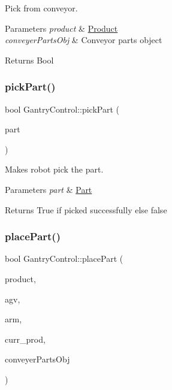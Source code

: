 Pick from conveyor. 


\begin{DoxyParams}{Parameters}
{\em product} & \hyperlink{structProduct}{Product} \\
\hline
{\em conveyer\+Parts\+Obj} & Conveyor parts object \\
\hline
\end{DoxyParams}
\begin{DoxyReturn}{Returns}
Bool 
\end{DoxyReturn}
\mbox{\label{classGantryControl_af9280bbee71d1ceca8aef3d616d48254}} 
\subsubsection{\texorpdfstring{pick\+Part()}{pickPart()}}
{\footnotesize\ttfamily bool Gantry\+Control\+::pick\+Part (\begin{DoxyParamCaption}\item[{\hyperlink{utils_8h_a67ee3a5b9091664130eca8efc8b97ab9}{part}}]{part }\end{DoxyParamCaption})}



Makes robot pick the part. 


\begin{DoxyParams}{Parameters}
{\em part} & \hyperlink{structPart}{Part} \\
\hline
\end{DoxyParams}
\begin{DoxyReturn}{Returns}
True if picked successfully else false 
\end{DoxyReturn}
\mbox{\label{classGantryControl_a17e2fb32a16a33c989903c4c1495c878}} 
\subsubsection{\texorpdfstring{place\+Part()}{placePart()}}
{\footnotesize\ttfamily bool Gantry\+Control\+::place\+Part (\begin{DoxyParamCaption}\item[{\hyperlink{utils_8h_a48a7207852c0455cce7e65703b12ec7e}{product} \&}]{product,  }\item[{std\+::string}]{agv,  }\item[{std\+::string}]{arm,  }\item[{struct \hyperlink{structall__Order}{all\+\_\+\+Order} $\ast$}]{curr\+\_\+prod,  }\item[{\hyperlink{classConveyerParts}{Conveyer\+Parts} \&}]{conveyer\+Parts\+Obj }\end{DoxyParamCaption})}



